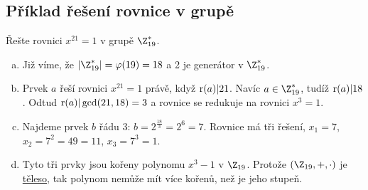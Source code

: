 \subsection{Příklad řešení rovnice v grupě}
Řešte rovnici $x^{21} = 1$ v grupě $\Z_{19}^*$.
\begin{enumerate}[a)]
	\item Již víme, že $|\Z_{19}^*| = \varphi(19) =18$ a 2 je generátor v $\Z_{19}^*$.
	\item Prvek $a$ řeší rovnici $x^{21} = 1$ právě, když $\operatorname*{r}(a)|21$. Navíc $a \in \Z_{19}^*$, tudíž $\operatorname*{r}(a) | 18$. Odtud $\operatorname*{r}(a) | \gcd(21, 18) = 3$ a rovnice se redukuje na rovnici $x^3 =1$.
	\item Najdeme prvek $b$ řádu 3: $b=2^{\frac{18}{3}} = 2^6 = 7$. Rovnice má tři řešení, $x_1 = 7$, $x_2 = 7^2 = 49 = 11$, $x_3 = 7^3 = 1$.
	\item Tyto tři prvky jsou kořeny polynomu $x^3 - 1$ v $\Z_{19}$. Protože $(\Z_{19}, +, \cdot)$ je \hyperref[teleso]{těleso}, tak polynom nemůže mít více kořenů, než je jeho stupeň.
\end{enumerate}
